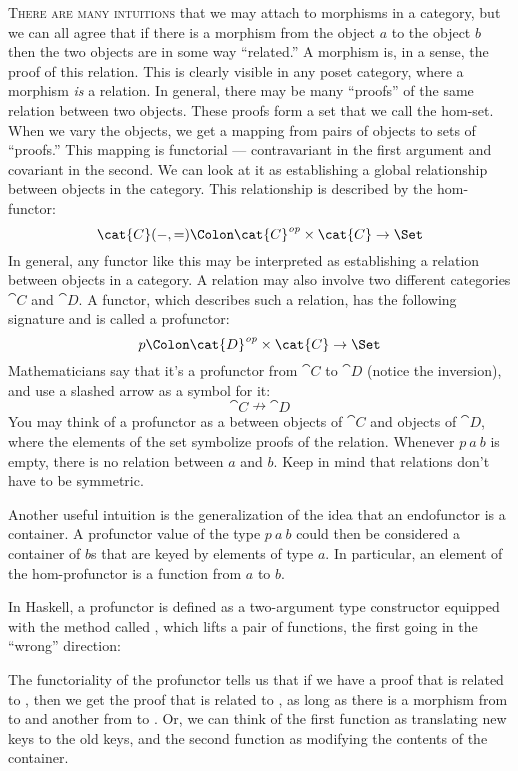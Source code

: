 
\lettrine[lhang=0.17]{T}{here are many intuitions} that we may attach to morphisms in a category,
but we can all agree that if there is a morphism from the object
$a$ to the object $b$ then the two objects are in some way
``related.'' A morphism is, in a sense, the proof of this relation. This
is clearly visible in any poset category, where a morphism \emph{is} a
relation. In general, there may be many ``proofs'' of the same relation
between two objects. These proofs form a set that we call the hom-set.
When we vary the objects, we get a mapping from pairs of objects to sets
of ``proofs.'' This mapping is functorial --- contravariant in the first
argument and covariant in the second. We can look at it as establishing
a global relationship between objects in the category. This relationship
is described by the hom-functor:
\[\cat{C}(-, =) \Colon \cat{C}^\mathit{op}\times{}\cat{C} \to \Set\]
In general, any functor like this may be interpreted as establishing a
relation between objects in a category. A relation may also involve two
different categories $\cat{C}$ and $\cat{D}$. A functor, which describes
such a relation, has the following signature and is called a profunctor:
\[p \Colon \cat{D}^\mathit{op}\times{}\cat{C} \to \Set\]
Mathematicians say that it's a profunctor from $\cat{C}$ to $\cat{D}$
(notice the inversion), and use a slashed arrow as a symbol for it:
\[\cat{C} \nrightarrow \cat{D}\]
You may think of a profunctor as a 
between objects of $\cat{C}$ and objects of $\cat{D}$, where the elements
of the set symbolize proofs of the relation. Whenever $p\ a\ b$
is empty, there is no relation between $a$ and $b$. Keep
in mind that relations don't have to be symmetric.

Another useful intuition is the generalization of the idea that an
endofunctor is a container. A profunctor value of the type
$p\ a\ b$ could then be considered a container of $b$s
that are keyed by elements of type $a$. In particular, an element
of the hom-profunctor is a function from $a$ to $b$.

In Haskell, a profunctor is defined as a two-argument type constructor
 equipped with the method called , which lifts a
pair of functions, the first going in the ``wrong'' direction:

The functoriality of the profunctor tells us that if we have a proof
that  is related to , then we get the proof that
 is related to , as long as there is a morphism from
 to  and another from  to . Or,
we can think of the first function as translating new keys to the old
keys, and the second function as modifying the contents of the
container.

